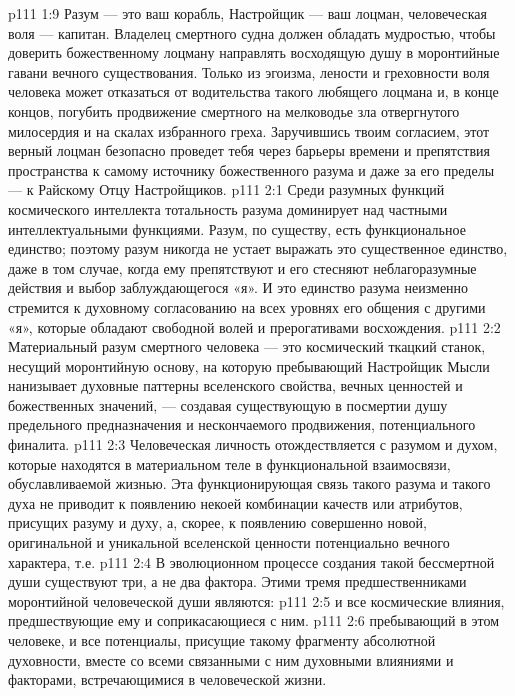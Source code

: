 \vs p111 1:9 \pc Разум --- это ваш корабль, Настройщик --- ваш лоцман, человеческая воля --- капитан. Владелец смертного судна должен обладать мудростью, чтобы доверить божественному лоцману направлять восходящую душу в моронтийные гавани вечного существования. Только из эгоизма, лености и греховности воля человека может отказаться от водительства такого любящего лоцмана и, в конце концов, погубить продвижение смертного на мелководье зла отвергнутого милосердия и на скалах избранного греха. Заручившись твоим согласием, этот верный лоцман безопасно проведет тебя через барьеры времени и препятствия пространства к самому источнику божественного разума и даже за его пределы --- к Райскому Отцу Настройщиков.
\vs p111 2:1 Среди разумных функций космического интеллекта тотальность разума доминирует над частными интеллектуальными функциями. Разум, по существу, есть функциональное единство; поэтому разум никогда не устает выражать это существенное единство, даже в том случае, когда ему препятствуют и его стесняют неблагоразумные действия и выбор заблуждающегося «я». И это единство разума неизменно стремится к духовному согласованию на всех уровнях его общения с другими «я», которые обладают свободной волей и прерогативами восхождения.
\vs p111 2:2 Материальный разум смертного человека --- это космический ткацкий станок, несущий моронтийную основу, на которую пребывающий Настройщик Мысли нанизывает духовные паттерны вселенского свойства, вечных ценностей и божественных значений, --- создавая существующую в посмертии душу предельного предназначения и нескончаемого продвижения, потенциального финалита.
\vs p111 2:3 Человеческая личность отождествляется с разумом и духом, которые находятся в материальном теле в функциональной взаимосвязи, обуславливаемой жизнью. Эта функционирующая связь такого разума и такого духа не приводит к появлению некоей комбинации качеств или атрибутов, присущих разуму и духу, а, скорее, к появлению совершенно новой, оригинальной и уникальной вселенской ценности потенциально вечного характера, т.е. 
\vs p111 2:4 \pc В эволюционном процессе создания такой бессмертной души существуют три, а не два фактора. Этими тремя предшественниками моронтийной человеческой души являются:
\vs p111 2:5 \bibnobreakspace {} и все космические влияния, предшествующие ему и соприкасающиеся с ним.
\vs p111 2:6 \pc {}\bibnobreakspace {} пребывающий в этом человеке, и все потенциалы, присущие такому фрагменту абсолютной духовности, вместе со всеми связанными с ним духовными влияниями и факторами, встречающимися в человеческой жизни.
